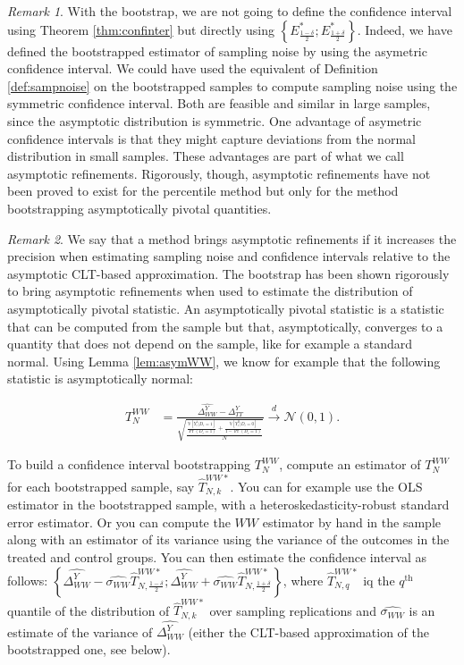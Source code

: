 \documentclass[
]{book}
\newcommand{\var}[1]{\mathbb{V}[ #1 ]}
\theoremstyle{definition}
\theoremstyle{definition}
\theoremstyle{definition}
\theoremstyle{definition}
\theoremstyle{remark}
\newtheorem*{remark}{Remark}
\begin{document}
\begin{remark}
\iffalse{} {Remark. } \fi{}With the bootstrap, we are not going to define the confidence interval using Theorem \ref{thm:confinter} but directly using \(\left\{E^*_{\frac{1-\delta}{2}};E^*_{\frac{1+\delta}{2}}\right\}\).
Indeed, we have defined the bootstrapped estimator of sampling noise by using the asymetric confidence interval.
We could have used the equivalent of Definition \ref{def:sampnoise} on the bootstrapped samples to compute sampling noise using the symmetric confidence interval.
Both are feasible and similar in large samples, since the asymptotic distribution is symmetric.
One advantage of asymetric confidence intervals is that they might capture deviations from the normal distribution in small samples.
These advantages are part of what we call asymptotic refinements.
Rigorously, though, asymptotic refinements have not been proved to exist for the percentile method but only for the method bootstrapping asymptotically pivotal quantities.
\end{remark}

\begin{remark}
\iffalse{} {Remark. } \fi{}We say that a method brings asymptotic refinements if it increases the precision when estimating sampling noise and confidence intervals relative to the asymptotic CLT-based approximation.
The bootstrap has been shown rigorously to bring asymptotic refinements when used to estimate the distribution of asymptotically pivotal statistic.
An asymptotically pivotal statistic is a statistic that can be computed from the sample but that, asymptotically, converges to a quantity that does not depend on the sample, like for example a standard normal.
Using Lemma \ref{lem:asymWW}, we know for example that the following statistic is asymptotically normal:
\end{remark}
\begin{align*}
  T_N^{WW} & = \frac{\hat{\Delta^Y_{WW}}-\Delta^Y_{TT}}{\sqrt{\frac{\frac{\var{Y_i^1|D_i=1}}{\Pr(D_i=1)}+\frac{\var{Y_i^0|D_i=0}}{1-\Pr(D_i=1)}}{N}}} \stackrel{d}{\rightarrow}\mathcal{N}\left(0,1\right).
\end{align*}

To build a confidence interval bootstrapping \(T_N^{WW}\), compute an estimator of \(T_N^{WW}\) for each bootstrapped sample, say \(\hat{T}_{N,k}^{WW*}\).
You can for example use the OLS estimator in the bootstrapped sample, with a heteroskedasticity-robust standard error estimator.
Or you can compute the \(WW\) estimator by hand in the sample along with an estimator of its variance using the variance of the outcomes in the treated and control groups.
You can then estimate the confidence interval as follows: \(\left\{\hat{\Delta^Y_{WW}}-\hat{\sigma_{WW}}\hat{T}^{WW*}_{N,\frac{1-\delta}{2}};\hat{\Delta^Y_{WW}}+\hat{\sigma_{WW}}\hat{T}^{WW*}_{N,\frac{1+\delta}{2}}\right\}\), where \(\hat{T}^{WW*}_{N,q}\) iq the \(q^{\text{th}}\) quantile of the distribution of \(\hat{T}_{N,k}^{WW*}\) over sampling replications and \(\hat{\sigma_{WW}}\) is an estimate of the variance of \(\hat{\Delta^Y_{WW}}\) (either the CLT-based approximation of the bootstrapped one, see below).
\end{document}
